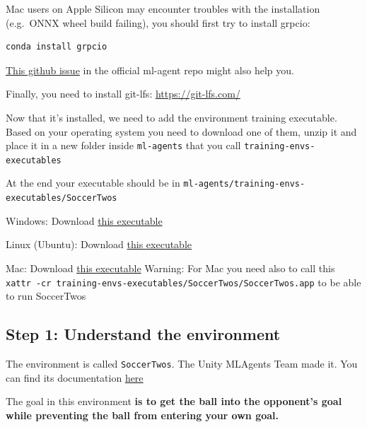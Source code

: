 \documentclass[11pt,a4paper]{article}
\begin{document}
Mac users on Apple Silicon may encounter troubles with the installation (e.g.~ONNX wheel build failing), you should first try to install grpcio:

\begin{lstlisting}
conda install grpcio
\end{lstlisting}

\href{https://github.com/Unity-Technologies/ml-agents/issues/6019}{This github issue} in the official ml-agent repo might also help you.

Finally, you need to install git-lfs: \url{https://git-lfs.com/}

Now that it's installed, we need to add the environment training executable. Based on your operating system you need to download one of them, unzip it and place it in a new folder inside \texttt{ml-agents} that you call \texttt{training-envs-executables}

At the end your executable should be in \texttt{ml-agents/training-envs-executables/SoccerTwos}

Windows: Download \href{https://drive.google.com/file/d/1sqFxbEdTMubjVktnV4C6ICjp89wLhUcP/view?usp=sharing}{this executable}

Linux (Ubuntu): Download \href{https://drive.google.com/file/d/1KuqBKYiXiIcU4kNMqEzhgypuFP5_45CL/view?usp=sharing}{this executable}

Mac: Download \href{https://drive.google.com/drive/folders/1h7YB0qwjoxxghApQdEUQmk95ZwIDxrPG?usp=share_link}{this executable} Warning: For Mac you need also to call this \texttt{xattr\ -cr\ training-envs-executables/SoccerTwos/SoccerTwos.app} to be able to run SoccerTwos

\subsection{Step 1: Understand the environment}\label{step-1-understand-the-environment}

The environment is called \texttt{SoccerTwos}. The Unity MLAgents Team made it. You can find its documentation \href{https://github.com/Unity-Technologies/ml-agents/blob/develop/docs/Learning-Environment-Examples.md\#soccer-twos}{here}

The goal in this environment \textbf{is to get the ball into the opponent's goal while preventing the ball from entering your own goal.}

\end{document}
